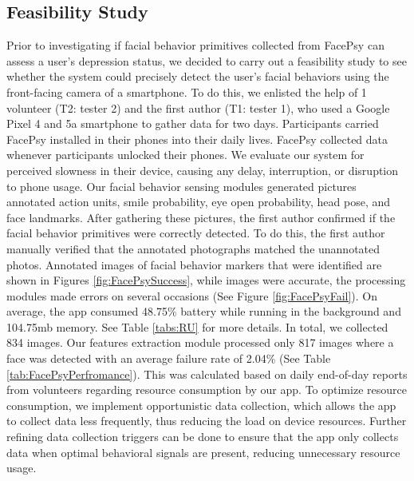 \subsection{Feasibility Study}
\label{sec:FS}
Prior to investigating if facial behavior primitives collected from FacePsy can assess a user's depression status, we decided to carry out a feasibility study to see whether the system could precisely detect the user's facial behaviors using the front-facing camera of a smartphone. To do this, we enlisted the help of 1 volunteer (T2: tester 2) and the first author (T1: tester 1), who used a Google Pixel 4 and 5a smartphone to gather data for two days. Participants carried FacePsy installed in their phones into their daily lives. FacePsy collected data whenever participants unlocked their phones. We evaluate our system for perceived slowness in their device, causing any delay, interruption, or disruption to phone usage. Our facial behavior sensing modules generated pictures annotated action units, smile probability, eye open probability, head pose, and face landmarks. After gathering these pictures, the first author confirmed if the facial behavior primitives were correctly detected. To do this, the first author manually verified that the annotated photographs matched the unannotated photos. Annotated images of facial behavior markers that were identified are shown in Figures \ref{fig:FacePsySuccess}, while images were accurate, the processing modules made errors on several occasions (See Figure \ref{fig:FacePsyFail}). On average, the app consumed 48.75\% battery while running in the background and 104.75mb memory. See Table \ref{tabs:RU} for more details. In total, we collected 834 images. Our features extraction module processed only 817 images where a face was detected with an average failure rate of 2.04\% (See Table \ref{tab:FacePsyPerfromance}). This was calculated based on daily end-of-day reports from volunteers regarding resource consumption by our app. To optimize resource consumption, we implement opportunistic data collection, which allows the app to collect data less frequently, thus reducing the load on device resources. Further refining data collection triggers can be done to ensure that the app only collects data when optimal behavioral signals are present, reducing unnecessary resource usage.

